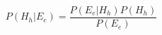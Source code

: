 \documentclass[12pt]{standalone}
\begin{document}
   \begin{varwidth}{50in}
        \begin{equation*}
            P\left(H_h|E_e\right)=\frac{P\left(E_e|H_h\right)P\left(H_h\right)}{P\left(E_e\right)}
        \end{equation*}
    \end{varwidth}
\end{document}
